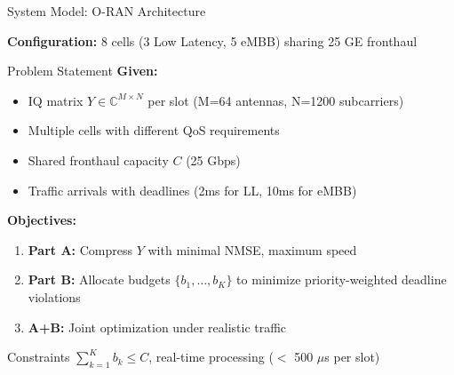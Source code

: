 \documentclass[aspectratio=169]{beamer}
\newcommand{\C}{\mathbb{C}}
\begin{document}
\begin{frame}{System Model: O-RAN Architecture}
\begin{center}
\end{center}

\textbf{Configuration:} 8 cells (3 Low Latency, 5 eMBB) sharing 25 GE fronthaul
\end{frame}

\begin{frame}{Problem Statement}
\textbf{Given:}
\begin{itemize}
    \item IQ matrix $Y \in \C^{M \times N}$ per slot (M=64 antennas, N=1200 subcarriers)
    \item Multiple cells with different QoS requirements
    \item Shared fronthaul capacity $C$ (25 Gbps)
    \item Traffic arrivals with deadlines (2ms for LL, 10ms for eMBB)
\end{itemize}

\vspace{0.3cm}
\textbf{Objectives:}
\begin{enumerate}
    \item \textbf{Part A:} Compress $Y$ with minimal NMSE, maximum speed
    \item \textbf{Part B:} Allocate budgets $\{b_1, \ldots, b_K\}$ to minimize priority-weighted deadline violations
    \item \textbf{A+B:} Joint optimization under realistic traffic
\end{enumerate}

\vspace{0.3cm}
\begin{alertblock}{Constraints}
$\sum_{k=1}^K b_k \leq C$, real-time processing ($<$ 500 $\mu$s per slot)
\end{alertblock}
\end{frame}
\end{document}
